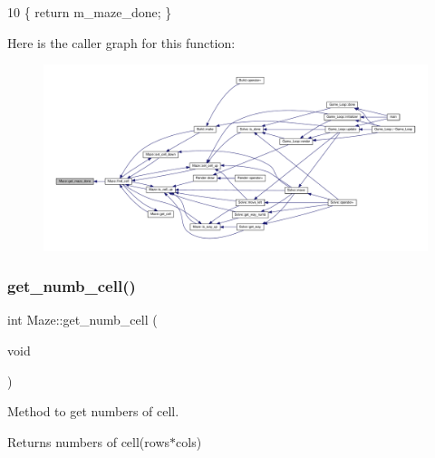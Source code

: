 \begin{DoxyCode}
10 \{ \textcolor{keywordflow}{return} m\_maze\_done; \}
\end{DoxyCode}
Here is the caller graph for this function\+:\nopagebreak
\begin{figure}[H]
\begin{center}
\leavevmode
\includegraphics[width=350pt]{classMaze_a152979999dd4c75014d65bf6deb5a00c_icgraph}
\end{center}
\end{figure}
\mbox{\label{classMaze_a90f5c1c140a9991942204d4a7fec3bf8}} 
\subsubsection{\texorpdfstring{get\+\_\+numb\+\_\+cell()}{get\_numb\_cell()}}
{\footnotesize\ttfamily int Maze\+::get\+\_\+numb\+\_\+cell (\begin{DoxyParamCaption}\item[{void}]{ }\end{DoxyParamCaption})}



Method to get numbers of cell. 

\begin{DoxyReturn}{Returns}
numbers of cell(rows$\ast$cols) 
\end{DoxyReturn}


